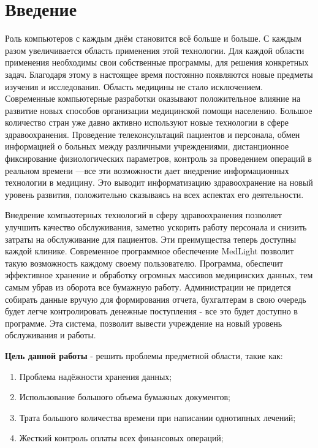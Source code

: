 \documentclass[a4paper, 10pt]{article}
\begin{document}
\section*{Введение}

	\hspace*{5mm}Роль компьютеров с каждым днём становится всё больше и больше. С каждым разом увеличивается область применения этой технологии. Для каждой области применения необходимы свои собственные программы, для решения конкретных задач. Благодаря этому в настоящее время постоянно появляются новые предметы изучения и исследования. Область медицины не стало исключением. Современные компьютерные разработки оказывают положительное влияние на развитие новых способов организации медицинской помощи населению. Большое количество стран уже давно активно используют новые технологии в сфере здравоохранения. Проведение телеконсультаций пациентов и персонала, обмен информацией о больных между различными учреждениями, дистанционное фиксирование физиологических параметров, контроль за проведением операций в реальном времени —все эти возможности дает внедрение информационных технологии в медицину. Это выводит информатизацию здравоохранение на новый уровень развития, положительно сказываясь на всех аспектах его деятельности.
	
	 \hspace*{5mm} Внедрение компьютерных технологий в сферу здравоохранения позволяет улучшить качество обслуживания, заметно ускорить работу персонала и снизить затраты на обслуживание для пациентов. Эти преимущества теперь доступны каждой клинике. Современное программное обеспечение MedLight позволит такую возможность каждому своему пользователю.  Программа, обеспечит эффективное хранение и обработку огромных массивов медицинских данных, тем самым убрав из оборота все бумажную работу. Администрации не придется собирать данные вручую для формирования отчета, бухгалтерам в свою очередь будет легче контролировать денежные поступления - все это будет доступно в программе. Эта система, позволит вывести учреждение на новый уровень обслуживания и работы.
	 
	 \textbf{Цель данной работы} - решить проблемы предметной области, такие как:
	 \begin{enumerate}
	 	\item Проблема надёжности хранения данных;
	 	\item Использование большого объема бумажных документов;
	 	\item Трата большого количества времени при написании однотипных лечений;
	 	\item Жесткий контроль оплаты всех финансовых операций;
	 \end{enumerate}
	
\end{document}
